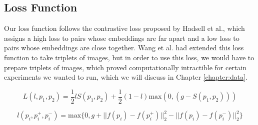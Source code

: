 \subsection{Loss Function}
Our loss function follows the contrastive loss proposed by Hadsell et al.\cite{hadsell2006dimensionality}, which assigns a high loss to pairs whose embeddings are far apart and a low loss to pairs whose embeddings are close together. Wang et al.\cite{} had extended this loss function to take triplets of images, but in order to use this loss, we would have to prepare triplets of images, which proved computationally intractible for certain experiments we wanted to run, which we will discuss in Chapter \ref{chapter:data}.

\begin{equation}
L(l, p_1, p_2) = \dfrac{1}{2}lS(p_1, p_2) + \dfrac{1}{2}(1-l)\text{max}(0, (g-S(p_1,p_2)))
\end{equation}

\begin{equation}
l(p_i, p_i^+, p_i^-) = \text{max}\{0, g + ||f(p_i) - f(p_i^+)||_2^2 - ||f(p_i)-f(p_i^-)||_2^2\}
\end{equation}


















